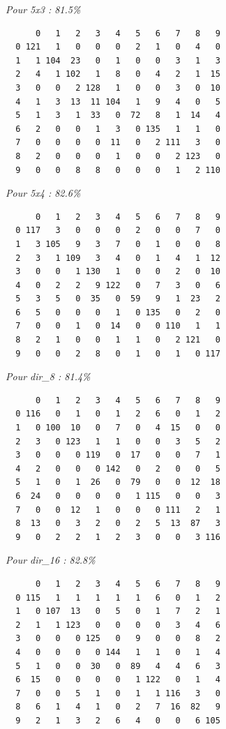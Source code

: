\textit{Pour 5x3 : 81.5\%}
\begin{lstlisting}
      0   1   2   3   4   5   6   7   8   9
  0 121   1   0   0   0   2   1   0   4   0
  1   1 104  23   0   1   0   0   3   1   3
  2   4   1 102   1   8   0   4   2   1  15
  3   0   0   2 128   1   0   0   3   0  10
  4   1   3  13  11 104   1   9   4   0   5
  5   1   3   1  33   0  72   8   1  14   4
  6   2   0   0   1   3   0 135   1   1   0
  7   0   0   0   0  11   0   2 111   3   0
  8   2   0   0   0   1   0   0   2 123   0
  9   0   0   8   8   0   0   0   1   2 110
\end{lstlisting}
\textit{Pour 5x4 : 82.6\%}
\begin{lstlisting}
      0   1   2   3   4   5   6   7   8   9
  0 117   3   0   0   0   2   0   0   7   0
  1   3 105   9   3   7   0   1   0   0   8
  2   3   1 109   3   4   0   1   4   1  12
  3   0   0   1 130   1   0   0   2   0  10
  4   0   2   2   9 122   0   7   3   0   6
  5   3   5   0  35   0  59   9   1  23   2
  6   5   0   0   0   1   0 135   0   2   0
  7   0   0   1   0  14   0   0 110   1   1
  8   2   1   0   0   1   1   0   2 121   0
  9   0   0   2   8   0   1   0   1   0 117
\end{lstlisting}
\textit{Pour dir\_8 : 81.4\%}
\begin{lstlisting}
      0   1   2   3   4   5   6   7   8   9
  0 116   0   1   0   1   2   6   0   1   2
  1   0 100  10   0   7   0   4  15   0   0
  2   3   0 123   1   1   0   0   3   5   2
  3   0   0   0 119   0  17   0   0   7   1
  4   2   0   0   0 142   0   2   0   0   5
  5   1   0   1  26   0  79   0   0  12  18
  6  24   0   0   0   0   1 115   0   0   3
  7   0   0  12   1   0   0   0 111   2   1
  8  13   0   3   2   0   2   5  13  87   3
  9   0   2   2   1   2   3   0   0   3 116
\end{lstlisting}
\textit{Pour dir\_16 : 82.8\%}
\begin{lstlisting}
      0   1   2   3   4   5   6   7   8   9
  0 115   1   1   1   1   1   6   0   1   2
  1   0 107  13   0   5   0   1   7   2   1
  2   1   1 123   0   0   0   0   3   4   6
  3   0   0   0 125   0   9   0   0   8   2
  4   0   0   0   0 144   1   1   0   1   4
  5   1   0   0  30   0  89   4   4   6   3
  6  15   0   0   0   0   1 122   0   1   4
  7   0   0   5   1   0   1   1 116   3   0
  8   6   1   4   1   0   2   7  16  82   9
  9   2   1   3   2   6   4   0   0   6 105
\end{lstlisting}
